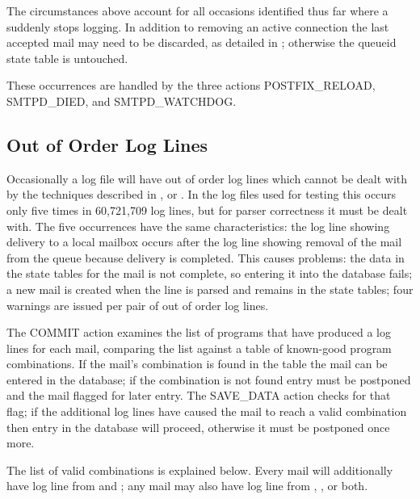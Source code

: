 The circumstances above account for all occasions identified thus far where
a  suddenly stops logging.  In addition to removing an active
connection the last accepted mail may need to be discarded, as detailed in
; otherwise the queueid state table
is untouched.

These occurrences are handled by the three actions POSTFIX\_RELOAD,
SMTPD\_DIED, and SMTPD\_WATCHDOG\@.

\subsection{Out of Order Log Lines}

\label{out of order log lines}

Occasionally a log file will have out of order log lines which cannot be
dealt with by the techniques described in ,  or .  In the \numberOFlogFILES{} log files used for
testing this occurs only five times in 60,721,709 log lines, but for parser
correctness it must be dealt with.  The five occurrences have the same
characteristics: the  log line showing delivery to a local
mailbox occurs after the  log line showing removal of the mail
from the queue because delivery is completed.  This causes problems: the
data in the state tables for the mail is not complete, so entering it into
the database fails; a new mail is created when the  line is
parsed and remains in the state tables; four warnings are issued per pair
of out of order log lines.

The COMMIT action examines the list of programs that have produced a log
lines for each mail, comparing the list against a table of known-good
program combinations.  If the mail's combination is found in the table the
mail can be entered in the database; if the combination is not found entry
must be postponed and the mail flagged for later entry.  The SAVE\_DATA
action checks for that flag; if the additional log lines have caused the
mail to reach a valid combination then entry in the database will proceed,
otherwise it must be postponed once more.

The list of valid combinations is explained below.  Every mail will
additionally have log line from  and ; any
mail may also have log line from , , or
both.

